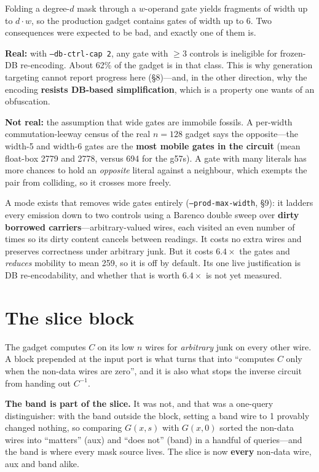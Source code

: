 \documentclass[11pt]{article}
\begin{document}
Folding a degree-$d$ mask through a $w$-operand gate yields fragments of width up
to $d\cdot w$, so the production gadget contains gates of width up to 6. Two
consequences were expected to be bad, and exactly one of them is.

\textbf{Real:} with \texttt{--db-ctrl-cap 2}, any gate with $\ge3$ controls is
ineligible for frozen-DB re-encoding. About 62\% of the gadget is in that class.
This is why generation targeting cannot report progress here (\S8)---and, in the
other direction, why the encoding \textbf{resists DB-based simplification},
which is a property one wants of an obfuscation.

\textbf{Not real:} the assumption that wide gates are immobile fossils. A
per-width commutation-leeway census of the real $n{=}128$ gadget says the
opposite---the width-5 and width-6 gates are the \textbf{most mobile gates in
the circuit} (mean float-box 2779 and 2778, versus 694 for the g57s). A gate
with many literals has more chances to hold an \emph{opposite} literal against a
neighbour, which exempts the pair from colliding, so it crosses more freely.

A mode exists that removes wide gates entirely (\texttt{--prod-max-width}, \S9):
it ladders every emission down to two controls using a Barenco double sweep over
\textbf{dirty borrowed carriers}---arbitrary-valued wires, each visited an even
number of times so its dirty content cancels between readings. It costs no extra
wires and preserves correctness under arbitrary junk. But it costs
$\mathbf{6.4\times}$ the gates and \emph{reduces} mobility to mean 259, so it is
off by default. Its one live justification is DB re-encodability, and whether
that is worth $6.4\times$ is not yet measured.

\section{The slice block}

The gadget computes $C$ on its low $n$ wires for \emph{arbitrary} junk on every
other wire. A block prepended at the input port is what turns that into
``computes $C$ only when the non-data wires are zero'', and it is also what stops
the inverse circuit from handing out $C^{-1}$.

\textbf{The band is part of the slice.} It was not, and that was a
one-query distinguisher: with the band outside the block, setting a band wire to
1 provably changed nothing, so comparing $G(x,s)$ with $G(x,0)$ sorted the
non-data wires into ``matters'' (aux) and ``does not'' (band) in a handful of
queries---and the band is where every mask source lives. The slice is now
\textbf{every} non-data wire, aux and band alike.
\end{document}
